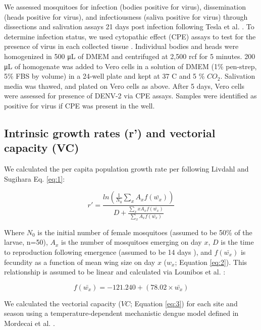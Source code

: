 \documentclass[12pt]{article}
\begin{document}
We assessed mosquitoes for infection (bodies positive for virus), dissemination (heads positive for virus), and infectiousness (saliva positive for virus) through dissections and salivation assays 21 days post infection following Tesla et al. \citep{tesla2017}. To determine infection status, we used cytopathic effect (CPE) assays to test for the presence of virus in each collected tissue \citep{balaya1969}. Individual bodies and heads were homogenized in 500 \si{\micro\liter} of DMEM and centrifuged at 2,500 rcf for 5 minutes. 200 \si{\micro\liter} of homogenate was added to Vero cells in a solution of DMEM (1\% pen-strep, 5\% FBS by volume) in a 24-well plate and kept at 37 \degree C and 5 \% ${CO_2}$. Salivation media was thawed, and plated on Vero cells as above. After 5 days, Vero cells were assessed for presence of DENV-2 via CPE assays. Samples were identified as positive for virus if CPE was present in the well.

\subsection{Intrinsic growth rates (r') and vectorial capacity (VC)}

We calculated the per capita population growth rate per following Livdahl and Sugihara \citep{livdahl1984} {Eq. \ref{eq:1}}:

\begin{equation} \label{eq:1}
r' = \frac{ln(\frac{1}{N_0}\sum_{x}^{ }{A_x}f(\bar{w_x}))}{D+\frac{\sum_{x}^{ }xA_xf(\bar{w_x})}{\sum_{x}^{ }A_xf(\bar{w_x})}}
\end{equation}

Where $N_0$ is the initial number of female mosquitoes (assumed to be 50\% of the larvae, n=50), $A_x$ is the number of mosquitoes emerging on day $x$, $D$ is the time to reproduction following emergence (assumed to be 14 days \citep{livdahl1991}), and $f(\bar{w_x})$ is fecundity as a function of mean wing size on day $x$ ($w_x$; Equation \ref{eq:2}). This relationship is assumed to be linear and calculated via Lounibos et al. \citep{lounibos2002}:

\begin{equation} \label{eq:2}
f(\bar{w_x}) = -121.240 + (78.02 \times \bar{w_x})
\end{equation}

We calculated the vectorial capacity ($VC$; Equation \ref{eq:3}) for each site and season using a temperature-dependent mechanistic dengue model defined in Mordecai et al. \citep{mordecai2017}.
\end{document}
